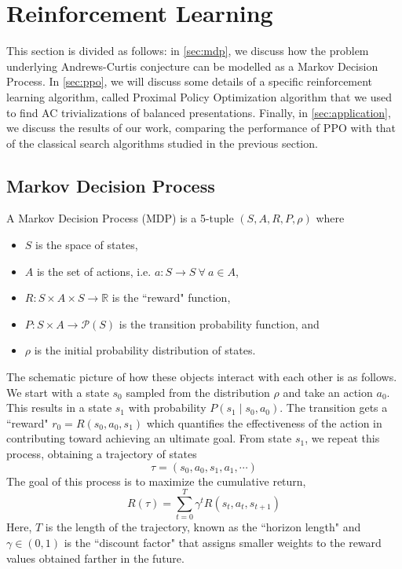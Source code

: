 
\section{Reinforcement Learning}\label{sec:rl}



This section is divided as follows: in \autoref{sec:mdp}, we discuss how the problem underlying Andrews-Curtis conjecture can be modelled as a Markov Decision Process. In \autoref{sec:ppo}, we will discuss some details of a specific reinforcement learning algorithm, called Proximal Policy Optimization algorithm that we used to find AC trivializations of balanced presentations. Finally, in \autoref{sec:application}, we discuss the results of our work, comparing the performance of PPO with that of the classical search algorithms studied in the previous section. 

\subsection{Markov Decision Process} \label{sec:mdp}

A Markov Decision Process (MDP) is a 5-tuple $(S, A, R, P, \rho)$ where 
\begin{itemize}
	\item $S$ is the space of states, 
	\item $A$ is the set of actions, i.e. $a \colon S \to S \ \forall \ a \in A$, 
	\item $R \colon S \times A \times S \to \mathbb{R}$ is the ``reward" function, 
	\item $P \colon S \times A \to \mathcal{P}(S)$ is the transition probability function, and 
	\item $\rho$ is the initial probability distribution of states. 
\end{itemize}

The schematic picture of how these objects interact with each other is as follows. We start with a state $s_0$ sampled from the distribution $\rho$ and take an action $a_0$. This results in a state $s_1$ with probability $P(s_1 \mid s_0, a_0) $. The transition gets a ``reward" $r_0 = R(s_0, a_0, s_1)$ which quantifies the effectiveness of the action in contributing toward achieving an ultimate goal. From state $s_1$, we repeat this process, obtaining a trajectory of states
\[
\tau = \left( s_0, a_0, s_1, a_1, \cdots \right)
\]
The goal of this process is to maximize the cumulative return,
\[
R(\tau) = \sum\limits_{t=0}^{T} \gamma^t R(s_t, a_t, s_{t+1})
\]
Here, $T$ is the length of the trajectory, known as the ``horizon length" and $\gamma \in \left(0, 1 \right)$ is the ``discount factor" that assigns smaller weights to the reward values obtained farther in the future. 
\newline

